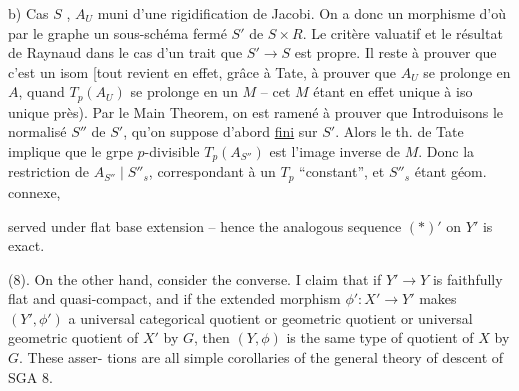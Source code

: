 b) Cas $S$  , $A_U$ muni d'une rigidification de Jacobi. On a donc un morphisme
\margin{\deleted{$\unsure{\ell}$}}
d'où par le  graphe un sous-schéma fermé $S'$ de $S\times R$. Le critère valuatif et le résultat de Raynaud dans le cas d'un trait  que $S'\to S$ est propre. Il reste à prouver que c'est un isom [tout revient en effet, grâce à Tate, à prouver que $A_U$ se prolonge en $A$, quand $T_p(A_U)$ se prolonge en un $M$ -- cet $M$ étant en effet unique à iso unique près). Par le Main Theorem, on est ramené à prouver que   Introduisons le normalisé $S''$ de $S'$, qu'on suppose d'abord \uline{fini} sur $S'$. Alors le th. de Tate implique que le grpe $p$-divisible $T_p(A_{S''})$  est l'image inverse de  $M$. Donc la restriction de $A_{S''}\mid S''_s$, correspondant à un $T_p$ ``constant'', et $S''_s$ étant géom. connexe,

served under flat base extension -- hence the analogous sequence $(*)'$ on $Y'$ is exact.

(8). On the other hand, consider the converse. I claim that if $Y'\longrightarrow Y$ is faithfully flat and quasi-compact, and if the extended morphism $\phi':X'\longrightarrow Y'$ makes $(Y',\phi')$ a universal categorical quotient or geometric quotient or universal geometric quotient of $X'$ by $G$, then $(Y,\phi)$ is the same type of quotient of $X$ by $G$. These asser-
tions are all simple corollaries of the general theory of descent of SGA 8.

